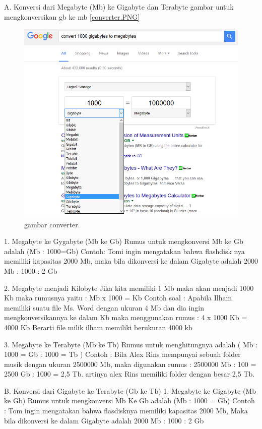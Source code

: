 A.	Konversi dari Megabyte (Mb) ke Gigabyte dan Terabyte
gambar untuk mengkonversikan gb ke mb \ref{converter.PNG}
\begin{figure}[ht]
\centerline{\includegraphics[width=1\textwidth]{figures/converter.PNG}}
\caption{gambar converter.}
\label{converter.png}
\end{figure}

1.	Megabyte ke Gygabyte (Mb ke Gb)
	Rumus untuk mengkonversi Mb ke Gb adalah (Mb : 1000=Gb)
	Contoh: 
	Tomi ingin mengatakan bahwa flashdisk nya memiliki kapasitas 2000 Mb, maka bila dikonversi  ke dalam Gigabyte adalah 2000 Mb : 1000 : 2 Gb 

2.	Megabyte menjadi Kilobyte
Jika kita memiliki 1 Mb maka akan menjadi 1000 Kb maka rumusnya yaitu :
Mb x 1000 = Kb
Contoh soal :
Apabila Ilham memiliki suatu file Ms. Word dengan ukuran 4 Mb dan dia ingin mengkonversikannya ke dalam Kb maka menggunakan rumus :
4 x 1000 Kb = 4000 Kb
Berarti file milik ilham memiliki berukuran 4000 kb

3.	Megabyte ke Terabyte (Mb ke Tb)
Rumus untuk menghitungnya adalah ( Mb : 1000 = Gb : 1000 = Tb )
Contoh :
Bila Alex Rins mempunyai sebuah folder musik dengan ukuran 2500000 Mb, maka digunakan rumus : 2500000 Mb : 100 = 2500 Gb : 1000 = 2,5 Tb.
artinya alex Rins memiliki folder dengan besar 2,5 Tb.

B.	Konversi dari Gigabyte ke Terabyte (Gb ke Tb)
1.	Megabyte ke Gigabyte (Mb ke Gb)
Rumus untuk mengkonversi Mb Ke Gb adalah (Mb : 1000 = Gb)
Contoh :
Tom ingin mengatakan bahwa flasdisknya memiliki kapasitas 2000 Mb, Maka bila dikonversi ke dalam Gigabyte adalah 2000 Mb : 1000 : 2 Gb

